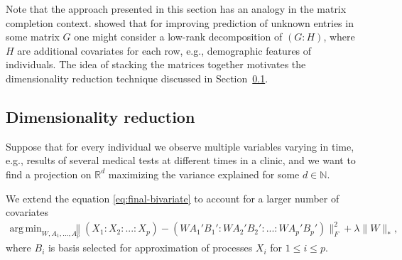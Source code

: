 \documentclass[preprint]{imsart}
\numberwithin{equation}{section}
\theoremstyle{plain}
\newcommand{\R}{\mathbb{R}}
\newcommand{\N}{\mathbb{N}}
\DeclareMathOperator*{\argmin}{arg\,min}
\begin{document}
Note that the approach presented in this section has an analogy in the matrix completion context. \citet{condli1999bayesian} showed that for improving prediction of unknown entries in some matrix $G$ one might consider a low-rank decomposition of $(G:H)$, where $H$ are additional covariates for each row, e.g., demographic features of individuals. The idea of stacking the matrices together motivates the dimensionality reduction technique discussed in Section~\ref{ss:dim-red}.


\subsection{Dimensionality reduction}\label{ss:dim-red}

Suppose that for every individual we observe multiple variables varying in time, e.g., results of several medical tests at different times in a clinic, and we want to find a projection on $\R^d$ maximizing the variance explained for some $d \in \N$. %

We extend the equation \eqref{eq:final-bivariate} to account for a larger number of covariates
\begin{align*}%
\argmin_{W,A_1,...,A_p} &\| (X_1:X_2:...:X_p) -  (WA_1'B_1':WA_2'B_2':...:WA_p'B_p') \|_F^2 + \lambda\|W\|_*,
\end{align*}
where $B_{i}$ is basis selected for approximation of processes $X_{i}$ for $1 \leq i \leq p$. 
\end{document}
